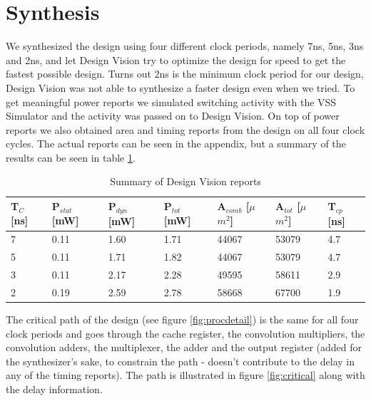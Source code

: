 \documentclass[11pt,a4paper]{article}
\begin{document}
\FloatBarrier
\section{Synthesis}
\label{sec:synthesis}
We synthesized the design using four different clock periods, namely 7ns, 5ns, 3ns and 2ns, and let Design Vision try to optimize the design for speed to get the fastest possible design. Turns out 2ns is the minimum clock period for our design, Design Vision was not able to synthesize a faster design even when we tried. To get meaningful power reports we simulated switching activity with the VSS Simulator and the activity was passed on to Design Vision. On top of power reports we also obtained area and timing reports from the design on all four clock cycles. The actual reports can be seen in the appendix, but a summary of the results can be seen in table \ref{tab:synth}.

\begin{table}[h]
	\caption{Summary of Design Vision reports}
	\begin{center}
		\begin{tabular}{|l|l|l|l|l|l|l|} \hline
			\textbf{T}$_{C}$ [ns]	& \textbf{P}$_{stat}$	[mW] & \textbf{P}$_{dyn}$ [mW]	& \textbf{P}$_{tot}$ [mW] & \textbf{A}$_{comb}$ [$\mu$$m^2$]& \textbf{A}$_{tot}$ [$\mu$$m^2$] & \textbf{T}$_{cp}$ [ns] \\ \hline
			7 & 0.11 & 1.60 & 1.71 & 44067 & 53079 & 4.7 \\ \hline
			5 & 0.11 & 1.71 & 1.82 & 44067 & 53079 & 4.7 \\ \hline
			3 & 0.11 & 2.17 & 2.28 & 49595 & 58611 & 2.9 \\ \hline
			2 & 0.19 & 2.59 & 2.78 & 58668 & 67700 & 1.9 \\ \hline
			
		\end{tabular}
	\end{center}
	\label{tab:synth}
\end{table}

The critical path of the design (see figure \ref{fig:procdetail}) is the same for all four clock periods and goes through the cache register, the convolution multipliers, the convolution adders, the multiplexer, the adder and the output register (added for the synthesizer's sake, to constrain the path - doesn't contribute to the delay in any of the timing reports). The path is illustrated in figure \ref{fig:critical} along with the delay information.
\end{document}
